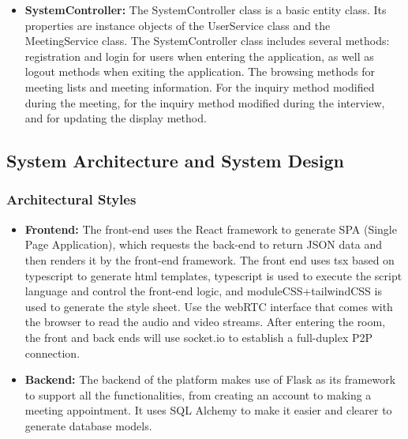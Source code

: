 \documentclass{article}
\begin{document}
\begin{itemize}
  \item \textbf{SystemController:} The SystemController class is a basic entity class. Its properties are instance objects of the UserService class and the MeetingService class. The SystemController class includes several methods: registration and login for users when entering the application, as well as logout methods when exiting the application. The browsing methods for meeting lists and meeting information. For the inquiry method modified during the meeting, for the inquiry method modified during the interview, and for updating the display method.
\end{itemize}

\subsection{System Architecture and System Design}

\subsubsection*{Architectural Styles}
\begin{itemize}
  \item \textbf{Frontend:} The front-end uses the React framework to generate SPA (Single Page Application), which requests the back-end to return JSON data and then renders it by the front-end framework. The front end uses tsx based on typescript to generate html templates, typescript is used to execute the script language and control the front-end logic, and moduleCSS+tailwindCSS is used to generate the style sheet. Use the webRTC interface that comes with the browser to read the audio and video streams. After entering the room, the front and back ends will use socket.io to establish a full-duplex P2P connection.
  \item \textbf{Backend:} The backend of the platform makes use of Flask as its framework to support all the functionalities, from creating an account to making a meeting appointment. It uses SQL Alchemy to make it easier and clearer to generate database models. 
\end{itemize}
\end{document}

